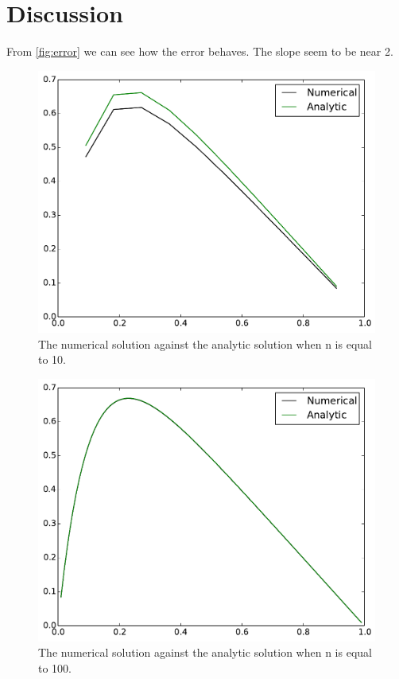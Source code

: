 \documentclass[12pt,norsk,a4paper]{article}
\begin{document}
\section{Discussion}

From \ref{fig:error} we can see how the error behaves. The slope seem to be near 2. 


\begin{figure}[H]
	\centering
	\includegraphics[width=0.7\linewidth]{bilder/n10}
	\caption{The numerical solution against the analytic solution when n is equal to 10.}
	\label{fig:n10}
\end{figure}

\begin{figure}[H]
	\centering
	\includegraphics[width=0.7\linewidth]{bilder/n100}
	\caption{The numerical solution against the analytic solution when n is equal to 100.}
	\label{fig:n100}
\end{figure}
\end{document}
